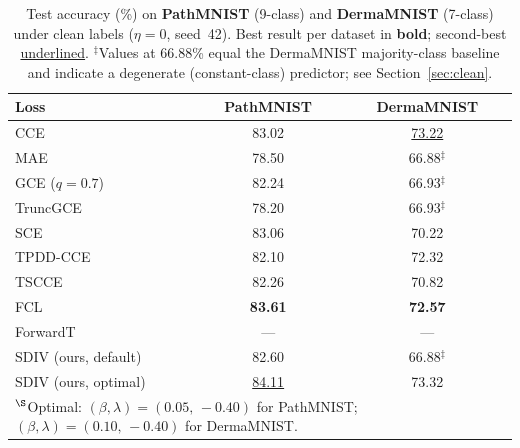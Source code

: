 
\begin{table}[t]
\centering
\caption{Test accuracy (\%) on \textbf{PathMNIST} (9-class) and
\textbf{DermaMNIST} (7-class) under clean labels ($\eta{=}0$, seed~42).
Best result per dataset in \textbf{bold}; second-best \underline{underlined}.
$^\ddagger$Values at 66.88\% equal the DermaMNIST majority-class baseline
and indicate a degenerate (constant-class) predictor; see Section~\ref{sec:clean}.}
\label{tab:clean_medical}
\small
\begin{tabular}{@{}lcc@{}}
\toprule
\textbf{Loss} & \textbf{PathMNIST} & \textbf{DermaMNIST} \\
\midrule
CCE              & 83.02             & \underline{73.22}   \\
MAE              & 78.50             & 66.88$^\ddagger$    \\
GCE ($q{=}0.7$)   & 82.24             & 66.93$^\ddagger$    \\
TruncGCE         & 78.20             & 66.93$^\ddagger$    \\
SCE              & 83.06             & 70.22               \\
TPDD-CCE         & 82.10             & 72.32               \\
TSCCE            & 82.26             & 70.82               \\
FCL              & \textbf{83.61}    & \textbf{72.57}      \\
ForwardT         & ---               & ---                 \\
SDIV (ours, default) & 82.60         & 66.88$^\ddagger$    \\
SDIV (ours, optimal) & \underline{84.11}\rlap{$^\S$} & 73.32\rlap{$^\S$} \\
\midrule
\multicolumn{3}{l}{\footnotesize $^\S$Optimal: $(\beta,\lambda){=}(0.05,\,-0.40)$ for PathMNIST;
  $(\beta,\lambda){=}(0.10,\,-0.40)$ for DermaMNIST.} \\
\bottomrule
\end{tabular}
\end{table}
